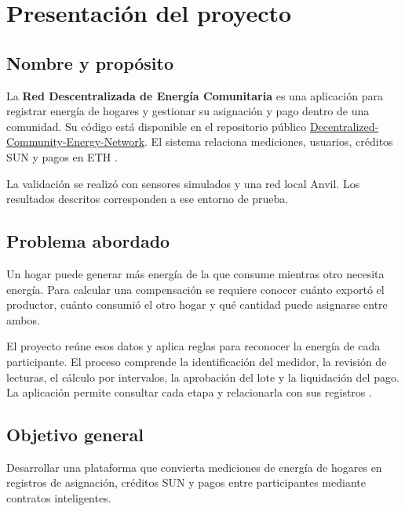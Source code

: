 \section{Presentación del proyecto}
\subsection{Nombre y propósito}
La \textbf{Red Descentralizada de Energía Comunitaria} es una aplicación para registrar energía de hogares y gestionar su asignación y pago dentro de una comunidad. Su código está disponible en el repositorio público \href{https://github.com/0x3ef/Decentralized-Community-Energy-Network}{Decentralized-Community-Energy-Network}. El sistema relaciona mediciones, usuarios, créditos SUN y pagos en ETH \citep{software}.

La validación se realizó con sensores simulados y una red local Anvil. Los resultados descritos corresponden a ese entorno de prueba.

\subsection{Problema abordado}
Un hogar puede generar más energía de la que consume mientras otro necesita energía. Para calcular una compensación se requiere conocer cuánto exportó el productor, cuánto consumió el otro hogar y qué cantidad puede asignarse entre ambos.

El proyecto reúne esos datos y aplica reglas para reconocer la energía de cada participante. El proceso comprende la identificación del medidor, la revisión de lecturas, el cálculo por intervalos, la aprobación del lote y la liquidación del pago. La aplicación permite consultar cada etapa y relacionarla con sus registros \citep{readme,settlement}.

\subsection{Objetivo general}
Desarrollar una plataforma que convierta mediciones de energía de hogares en registros de asignación, créditos SUN y pagos entre participantes mediante contratos inteligentes.

